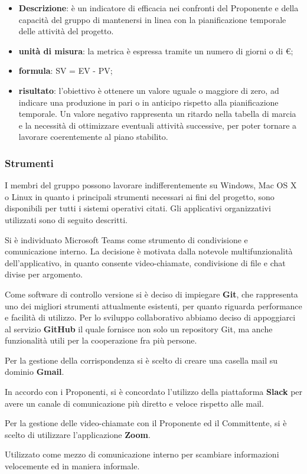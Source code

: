 		\begin{itemize}
			\item \textbf{Descrizione}: è un indicatore di efficacia nei confronti del Proponente e della capacità del gruppo di mantenersi in linea con la pianificazione temporale delle attività del progetto.
			\item \textbf{unità di misura}: la metrica è espressa tramite un numero di giorni o di €;
			\item \textbf{formula}: SV = EV - PV;
			\item \textbf{risultato}: l'obiettivo è ottenere un valore uguale o maggiore di zero, ad indicare una produzione in pari o in anticipo rispetto alla pianificazione temporale. Un valore negativo rappresenta un ritardo nella tabella di marcia e la necessità di ottimizzare eventuali attività successive, per poter tornare a lavorare coerentemente al piano stabilito.
		\end{itemize}
		\subsubsection{Strumenti}
			I membri del gruppo \Gruppo{} possono lavorare indifferentemente su Windows, Mac OS X o Linux in quanto i principali strumenti necessari ai fini del progetto, sono disponibili per tutti i sistemi operativi citati. Gli applicativi organizzativi utilizzati sono di seguito descritti.
			
				Si è individuato Microsoft Teams come strumento di condivisione e comunicazione interno. La decisione è motivata dalla notevole multifunzionalità dell'applicativo, in quanto consente video-chiamate, condivisione di file e chat divise per argomento.
				
				Come software di controllo versione si è deciso di impiegare \textbf{Git}, che rappresenta uno dei migliori strumenti attualmente esistenti, per quanto riguarda performance e facilità di utilizzo. Per lo sviluppo collaborativo abbiamo deciso di appoggiarci al servizio \textbf{GitHub} il quale fornisce non solo un repository\ped{\textit{G}} Git, ma anche funzionalità utili per la cooperazione fra più persone.
							
				Per la gestione della corrispondenza si è scelto di creare una casella mail su dominio \textbf{Gmail}.
				
				In accordo con i Proponenti, si è concordato l'utilizzo della piattaforma \textbf{Slack} per avere un canale di comunicazione più diretto e veloce rispetto alle mail.
			
				Per la gestione delle video-chiamate con il Proponente ed il Committente, si è scelto di utilizzare l'applicazione \textbf{Zoom}.
				
				Utilizzato come mezzo di comunicazione interno per scambiare informazioni velocemente ed in maniera informale.
	
